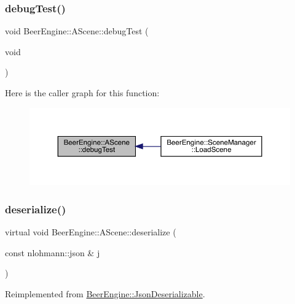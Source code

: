 \subsubsection{\texorpdfstring{debug\+Test()}{debugTest()}}
{\footnotesize\ttfamily void Beer\+Engine\+::\+A\+Scene\+::debug\+Test (\begin{DoxyParamCaption}\item[{void}]{ }\end{DoxyParamCaption})}

Here is the caller graph for this function\+:\nopagebreak
\begin{figure}[H]
\begin{center}
\leavevmode
\includegraphics[width=350pt]{class_beer_engine_1_1_a_scene_a44f55dbd991eb07e425ca163f4773766_icgraph}
\end{center}
\end{figure}
\mbox{\label{class_beer_engine_1_1_a_scene_a3db491adb7ff57a3a527024fd0a6001f}} 
\subsubsection{\texorpdfstring{deserialize()}{deserialize()}}
{\footnotesize\ttfamily virtual void Beer\+Engine\+::\+A\+Scene\+::deserialize (\begin{DoxyParamCaption}\item[{const nlohmann\+::json \&}]{j }\end{DoxyParamCaption})\hspace{0.3cm}{\ttfamily [virtual]}}



Reimplemented from \mbox{\hyperlink{class_beer_engine_1_1_json_deserializable_ae1ce96bc441e544e7339641d80925726}{Beer\+Engine\+::\+Json\+Deserializable}}.

\mbox{\label{class_beer_engine_1_1_a_scene_af40b9c9c30c3c55991792d45867c022b}} 
